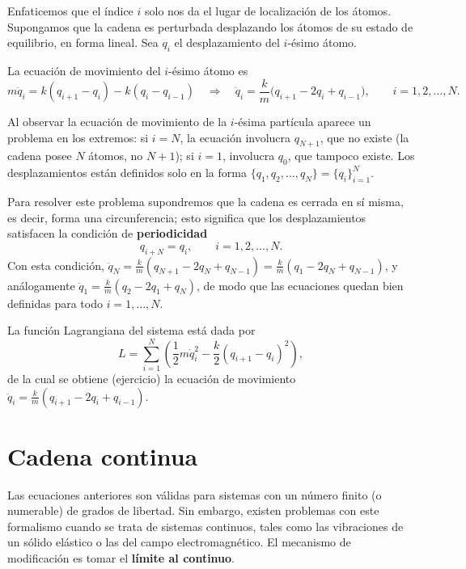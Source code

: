Enfaticemos que el índice $i$ solo nos da el lugar de localización de
los átomos. Supongamos que la cadena es perturbada desplazando los
átomos de su estado de equilibrio, en forma lineal. Sea $q_i$ el
desplazamiento del $i$-ésimo átomo.

\begin{proposicionc}
La ecuación de movimiento del $i$-ésimo átomo es
\[
m\ddot q_i = k(q_{i+1}-q_i) - k(q_i-q_{i-1}) \quad\Longrightarrow\quad
\ddot q_i = \frac{k}{m}\big(q_{i+1}-2q_i+q_{i-1}\big), \qquad
i=1,2,\dots,N.
\]
\end{proposicionc}

\begin{observacion}
Al observar la ecuación de movimiento de la $i$-ésima partícula aparece
un problema en los extremos: si $i=N$, la ecuación involucra $q_{N+1}$,
que no existe (la cadena posee $N$ átomos, no $N+1$); si $i=1$, involucra
$q_0$, que tampoco existe. Los desplazamientos están definidos solo en la
forma $\{q_1,q_2,\dots,q_N\}=\{q_i\}_{i=1}^N$.
\end{observacion}

Para resolver este problema supondremos que la cadena es cerrada en sí
misma, es decir, forma una circunferencia; esto significa que los
desplazamientos satisfacen la condición de \textbf{periodicidad}
\[
q_{i+N} = q_i, \qquad i=1,2,\dots,N.
\]
Con esta condición, $\ddot q_N = \tfrac{k}{m}(q_{N+1}-2q_N+q_{N-1}) =
\tfrac{k}{m}(q_1-2q_N+q_{N-1})$, y análogamente $\ddot q_1 =
\tfrac{k}{m}(q_2-2q_1+q_N)$, de modo que las ecuaciones quedan bien
definidas para todo $i=1,\dots,N$.

\begin{proposicionc}
La función Lagrangiana del sistema está dada por
\[
L = \sum_{i=1}^{N} \left(\frac{1}{2}m\dot q_i^2 -
\frac{k}{2}(q_{i+1}-q_i)^2\right),
\]
de la cual se obtiene (ejercicio) la ecuación de movimiento
$\ddot q_i = \tfrac{k}{m}(q_{i+1}-2q_i+q_{i-1})$.
\end{proposicionc}

\section{Cadena continua}

Las ecuaciones anteriores son válidas para sistemas con un número finito
(o numerable) de grados de libertad. Sin embargo, existen problemas con
este formalismo cuando se trata de sistemas continuos, tales como las
vibraciones de un sólido elástico o las del campo electromagnético. El
mecanismo de modificación es tomar el \textbf{límite al continuo}.

